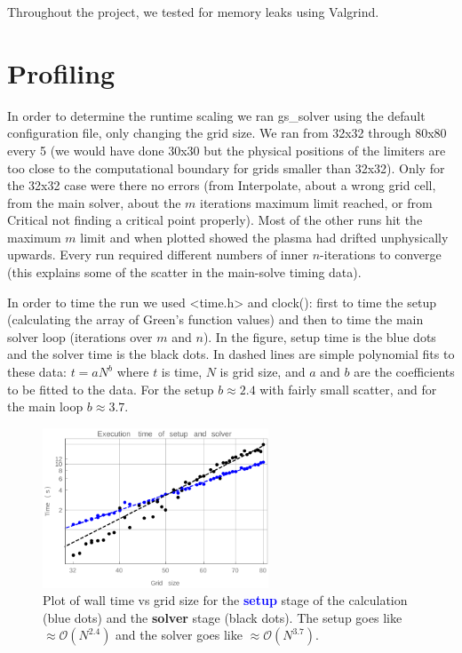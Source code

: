 \documentclass[paper=letter, fontsize=11pt]{scrartcl} %
\begin{document}
Throughout the project, we tested for memory leaks using Valgrind.


\section{Profiling}

In order to determine the runtime scaling we ran gs\_solver using the default configuration file, only changing the grid size. We ran from 32x32 through 80x80 every 5 (we would have done 30x30 but the physical positions of the limiters are too close to the computational boundary for grids smaller than 32x32). Only for the 32x32 case were there no errors (from Interpolate, about a wrong grid cell, from the main solver, about the $m$ iterations maximum limit reached, or from Critical not finding a critical point properly). Most of the other runs hit the maximum $m$ limit and when plotted showed the plasma had drifted unphysically upwards. Every run required different numbers of inner $n$-iterations to converge (this explains some of the scatter in the main-solve timing data).

In order to time the run we used <time.h> and clock(): first to time the setup (calculating the array of Green's function values) and then to time the main solver loop (iterations over $m$ and $n$). In the figure, setup time is the blue dots and the solver time is the black dots. In dashed lines are simple polynomial fits to these data: $t = a N^b$ where $t$ is time, $N$ is grid size, and $a$ and $b$ are the coefficients to be fitted to the data. For the setup $b \approx 2.4$ with fairly small scatter, and for the main loop $b \approx 3.7$.

\begin{figure}
	\centering
	\includegraphics[width=0.6\textwidth]{run_times.pdf}
	\caption{Plot of wall time vs grid size for the \textcolor{blue}{\textbf{setup}} stage of the calculation (blue dots) and the \textbf{solver} stage (black dots).  The setup goes like $\approx \mathcal{O}(N^{2.4})$ and the solver goes like $\approx \mathcal{O}(N^{3.7})$.}
\end{figure}
\end{document}
